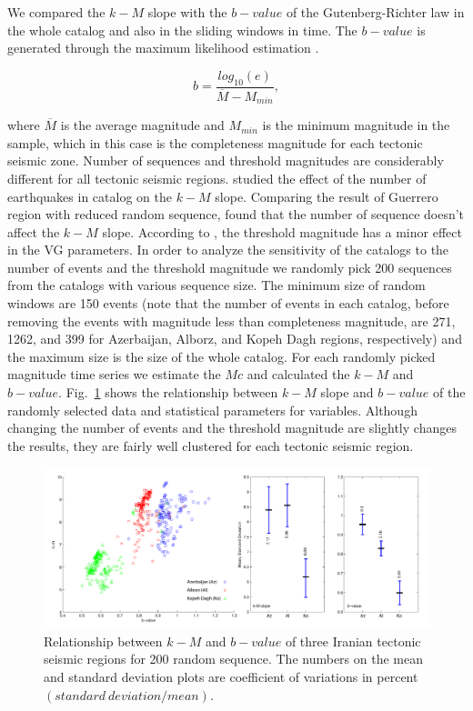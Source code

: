 \noindent
We compared the $k-M$ slope with the $b-value$ of the Gutenberg-Richter law in the whole catalog and also in the sliding windows in time. The $b-value$ is generated through the maximum likelihood estimation \citep{Aki1965}.

\begin{equation}
b = \frac{log_{10}(e) }{\overline{M} - M_{min}},
\end{equation}
 
 \noindent
 where $\overline{M}$ is the average magnitude and $M_{min}$ is the minimum magnitude in the sample, which in this case is the completeness magnitude for each tectonic seismic zone. Number of sequences and threshold magnitudes are considerably different for all tectonic seismic regions. \citet{Telesca2013} studied the effect of the number of earthquakes in catalog on the $k-M$ slope. Comparing the result of Guerrero region with reduced random sequence, \citet{Telesca2013} found that the number of sequence doesn't affect the $k-M$ slope.  According to \citet{Telesca2012}, the threshold magnitude has a minor effect in the VG parameters. In order to analyze the sensitivity of the catalogs to the number of events and the threshold magnitude we randomly pick 200 sequences from the catalogs with various sequence size. The minimum size of random windows are 150 events (note that the number of events in each catalog, before removing the events with magnitude less than completeness magnitude, are 271, 1262, and 399 for Azerbaijan, Alborz, and Kopeh Dagh regions, respectively) and the maximum size is the size of the whole catalog. For each randomly picked magnitude time series we estimate the $Mc$ and calculated the $k-M$ and $b-value$. Fig.~\ref{fig:random} shows the relationship between $k-M$ slope and $b-value$ of the randomly selected data and statistical parameters for variables. Although changing the number of events and the threshold magnitude are slightly changes the results, they are fairly well clustered for each tectonic seismic region. 
 
 \begin{figure} [ht]
\centering
\includegraphics[scale=0.4]{figures/pdf/Figure06.pdf} 
\caption{ Relationship between $k-M$ and $b-value$ of three Iranian tectonic seismic regions for 200 random sequence. The numbers on the mean and standard deviation plots are coefficient of variations in percent$(standard \ deviation / mean)$.}
\label{fig:random}
\end{figure}
 
